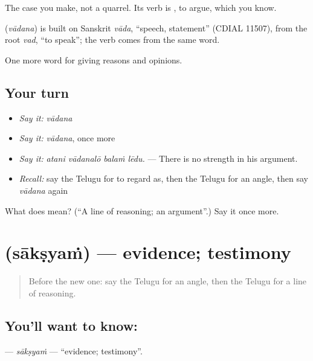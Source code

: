 The case you make, not a quarrel. Its verb is , to argue, which you know.

\begin{cousinweb}
\textbf{} (\emph{vādana}) is built on Sanskrit \emph{vāda}, \textquotedblleft{}speech, statement\textquotedblright{} (CDIAL 11507), from the root \emph{vad}, \textquotedblleft{}to speak\textquotedblright{}; the verb  comes from the same word.
\end{cousinweb}

\begin{grammarlens}[title={What you've built}]
One more word for giving reasons and opinions.
\end{grammarlens}

\subsection*{Your turn}
\begin{itemize}
\raggedright
  \item \emph{Say it:} \emph{vādana}
  \item \emph{Say it:} \emph{vādana}, once more
  \item \emph{Say it:} \emph{atani vādanalō balaṁ lēdu.} — There is no strength in his argument.
  \item \emph{Recall:} say the Telugu for to regard as, then the Telugu for an angle, then say \emph{vādana} again
\end{itemize}

\begin{tcolorbox}[breakable,colback=teal!4,colframe=teal!35!black,title={Before you move on}]
What does  mean? (\textquotedblleft{}A line of reasoning; an argument\textquotedblright{}.) Say it once more.
\end{tcolorbox}
\section[\texorpdfstring{\te{సాక్ష్యం} (sākṣyaṁ)}{సాక్ష్యం (sākṣyaṁ)}]{ (sākṣyaṁ) — evidence; testimony}

\label{lesson:TE-C383-saksyam}



\begin{quote}
Before the new one: say the Telugu for an angle, then the Telugu for a line of reasoning.
\end{quote}

\subsection*{You'll want to know: }
\textbf{} — \emph{sākṣyaṁ} — \textquotedblleft{}evidence; testimony\textquotedblright{}.

